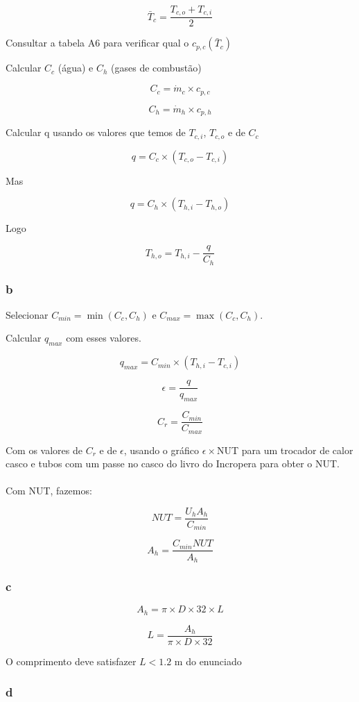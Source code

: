 \[\bar{T}_{c} = \frac{T_{c,o}+T_{c,i}}{2}\]

Consultar a tabela A6 para verificar qual o $c_{p,c}(\bar{T}_{c})$

Calcular $C_{c}$ (água) e $C_{h}$ (gases de combustão)

\[C_{c} = \dot{m}_{c} \times c_{p,c}\]

\[C_{h} = \dot{m}_{h} \times c_{p,h}\]

Calcular q usando os valores que temos de $T_{c,i}$, $T_{c,o}$ e de $C_{c}$

\[q = C_{c} \times (T_{c,o}-T_{c,i})\]

Mas 

\[q = C_{h} \times (T_{h,i}-T_{h,o})\]

Logo

\[T_{h,o} = T_{h,i} - \frac{q}{C_{h}}\]




\subsubsection{b}

Selecionar $C_{min} = \min(C_{c},C_{h})$ e $C_{max} = \max(C_{c},C_{h})$.

Calcular $q_{max}$ com esses valores.

\[q_{max} = C_{min} \times (T_{h,i} - T_{c,i})\]

\[\epsilon = \frac{q}{q_{max}}\]

\[C_{r} = \frac{C_{min}}{C_{max}}\]

Com os valores de $C_{r}$ e de $\epsilon$, usando o gráfico $\epsilon \times$NUT para um trocador de calor casco e tubos com um passe no casco do livro do Incropera para obter o NUT.\\ \\

Com NUT, fazemos:

\[NUT = \frac{U_{h}A_{h}}{C_{min}}\]

\[A_{h}= \frac{C_{min}NUT}{A_{h}}\]


\subsubsection{c}

\[ A_{h} = \pi \times D \times 32 \times L  \] 

\[L = \frac{A_{h}}{\pi \times D \times 32 }\]

O comprimento deve satisfazer $L < 1.2$ m do enunciado
\subsubsection{d}

